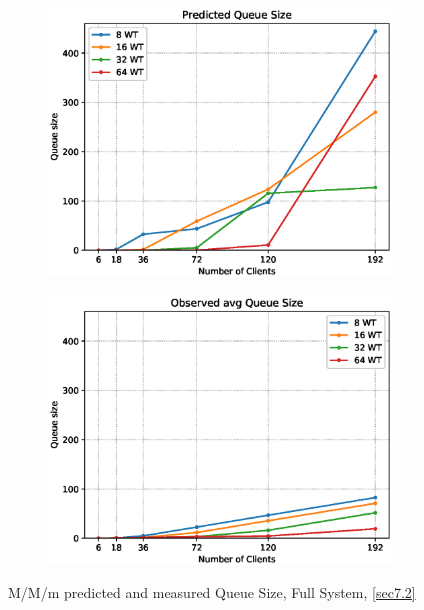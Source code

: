 \documentclass[11pt,a4paper]{article}
\begin{document}
\begin{figure}
    \begin{subfigure}{.5\textwidth}
        \includegraphics[width=1\linewidth]{plots/7_MMm_QueueSizePred.eps}
    \end{subfigure}
    \begin{subfigure}{.5\textwidth}
        \includegraphics[width=1\linewidth]{plots/7_MMm_QueueSizeObserved.eps}
    \end{subfigure}
    \caption{M/M/m predicted and measured Queue Size, Full System, \autoref{sec7.2}}
    \label{fig:mmm-queueLen}
\end{figure}
\end{document}
